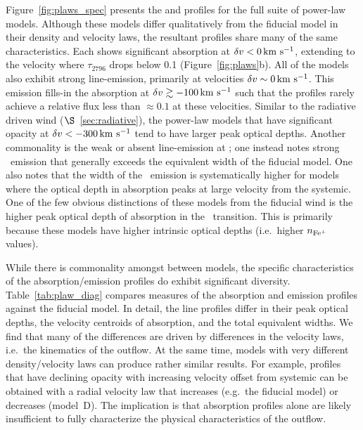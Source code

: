 \documentclass[12pt,preprint]{aastex}
\begin{document}
Figure~\ref{fig:plaws_spec} presents the  and 
profiles for the full suite of power-law models.  Although these
models differ qualitatively from the fiducial model in their density
and velocity laws, the resultant profiles share many of the same
characteristics.  Each shows significant absorption at $\delta v < 0
\, {\rm km~s^{-1}}$, extending to the velocity where $\tau_{2796}$ drops below 0.1
(Figure~\ref{fig:plaws}b).  All of the models also exhibit strong
line-emission, primarily at velocities $\delta v \sim 0 \, {\rm km~s^{-1}}$.  
This emission fills-in the  absorption at $\delta v \gtrsim
-100 \, {\rm km~s^{-1}}$ such that the profiles rarely achieve a relative flux less
than $\approx 0.1$ at these velocities. 
Similar to the radiative driven wind ($\S$~\ref{sec:radiative}),
the power-law models that have significant opacity at $\delta v <
-300 \, {\rm km~s^{-1}}$ tend to have larger peak optical depths.  Another commonality is
the weak or absent line-emission at \feiia; one instead notes strong
\feiic\ emission that generally exceeds the equivalent width of the
fiducial model.  One also notes that the width of the \feiis\ emission
is systematically higher for models where the optical depth in
absorption peaks at large velocity from the systemic.
One of the few obvious distinctions of these models from the fiducial wind is
the higher peak optical depth of absorption in the \feiib\
transition.  This is primarily because these models have 
higher intrinsic optical depths (i.e.\ higher $n_{\rm Fe^+}$ values).

While there is commonality amongst between models, the specific
characteristics of the absorption/emission profiles do exhibit
significant diversity.
Table~\ref{tab:plaw_diag} compares measures of the absorption and
emission profiles against the fiducial model.
In detail, the line profiles differ in their peak optical depths,
the velocity centroids of absorption, and the total equivalent widths.
We find that many of the differences are driven by differences in
the velocity laws, i.e.\ the kinematics of the outflow.
At the same time, models with very different density/velocity laws can
produce rather similar results.  For example, profiles that have declining
opacity with increasing velocity offset from systemic can be obtained
with a radial velocity law that increases (e.g.\ the fiducial model)
or decreases (model~D).  The implication is that absorption profiles
alone are likely insufficient to fully characterize the physical
characteristics of the outflow.


\end{document}
